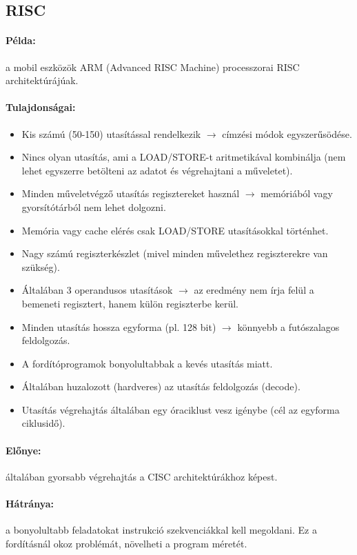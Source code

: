 \subsection{RISC}
\paragraph{Példa:} a mobil eszközök ARM (Advanced RISC Machine) processzorai RISC architektúrájúak.
\paragraph{Tulajdonságai:}
\begin{itemize}
    \item Kis számú (50-150) utasítással rendelkezik $\rightarrow$ címzési módok egyszerűsödése.
    \item Nincs olyan utasítás, ami a LOAD/STORE-t aritmetikával kombinálja (nem lehet egyszerre betölteni az adatot és végrehajtani a műveletet).
    \item Minden műveletvégző utasítás regisztereket használ $\rightarrow$ memóriából vagy gyorsítótárból nem lehet dolgozni.
    \item Memória vagy cache elérés csak LOAD/STORE utasításokkal történhet.
    \item Nagy számú regiszterkészlet (mivel minden művelethez regiszterekre van szükség).
    \item Általában 3 operandusos utasítások $\rightarrow$ az eredmény nem írja felül a bemeneti regisztert, hanem külön regiszterbe kerül.
    \item Minden utasítás hossza egyforma (pl. 128 bit) $\rightarrow$ könnyebb a futószalagos feldolgozás.
    \item A fordítóprogramok bonyolultabbak a kevés utasítás miatt.
    \item Általában huzalozott (hardveres) az utasítás feldolgozás (decode).
    \item Utasítás végrehajtás általában egy óraciklust vesz igénybe (cél az egyforma ciklusidő).
\end{itemize}
\paragraph{Előnye:} általában gyorsabb végrehajtás a CISC architektúrákhoz képest.
\paragraph{Hátránya:} a bonyolultabb feladatokat instrukció szekvenciákkal kell megoldani.
Ez a fordításnál okoz problémát, növelheti a program méretét.
